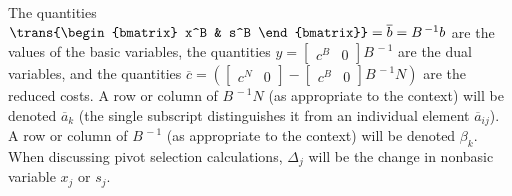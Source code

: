 The quantities
$\trans{\begin{bmatrix} x^B & s^B \end{bmatrix}} =
\overline{b} = B^{\,-1}b$ are the values of the basic
variables, the quantities
$y = \begin{bmatrix} c^B & 0 \end{bmatrix}B^{\,-1}$ are the dual
variables, and the quantities
$\overline{c} = \left(
		  \begin{bmatrix} c^N & 0 \end{bmatrix} -
		  \begin{bmatrix} c^B & 0 \end{bmatrix} B^{\,-1} N
		\right)$
are the reduced costs.
A row or column of $B^{\,-1}N$ (as appropriate to the context) will be
denoted $\overline{a}_k$ (the single subscript distinguishes it from an
individual element $\overline{a}_{ij}$).
A row or column of $B^{\,-1}$ (as appropriate to the context) will be
denoted $\beta_k$.
When discussing pivot selection calculations, $\Delta_j$ will be the
change in nonbasic variable $x_j$ or $s_j$.

